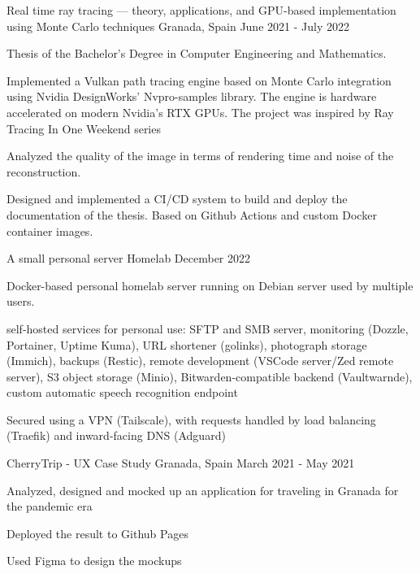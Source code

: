 
\begin{cventries}
    \cventry
      {}
      {Real time ray tracing — theory, applications, and GPU-based implementation using Monte Carlo techniques}
      {Granada, Spain}
      {June 2021 - July 2022}
      {
        \begin{cvitems} %
          \item {Thesis of the Bachelor's Degree in Computer Engineering and Mathematics.}
          \item {Implemented a Vulkan path tracing engine based on Monte Carlo integration using Nvidia DesignWorks' Nvpro-samples library. The engine is hardware accelerated on modern Nvidia's RTX GPUs. The project was inspired by Ray Tracing In One Weekend series}
          \item {Analyzed the quality of the image in terms of rendering time and noise of the reconstruction.}
          \item {Designed and implemented a CI/CD system to build and deploy the documentation of the thesis. Based on Github Actions and custom Docker container images.}
        \end{cvitems}
      }

    \cventry
        {A small personal server}
        {Homelab}
        {}
        {December 2022}
        {
          \begin{cvitems} %
            \item {Docker-based personal homelab server running on Debian server used by multiple users.}
            \item {self-hosted services for personal use: SFTP and SMB server, monitoring (Dozzle, Portainer, Uptime Kuma), URL shortener (golinks), photograph storage (Immich), backups (Restic), remote development (VSCode server/Zed remote server), S3 object storage (Minio), Bitwarden-compatible backend (Vaultwarnde), custom automatic speech recognition endpoint }
            \item {Secured using a VPN (Tailscale), with requests handled by load balancing (Traefik) and inward-facing DNS (Adguard) }
          \end{cvitems}
        }

    \cventry
      {}
      {CherryTrip - UX Case Study}
      {Granada, Spain}
      {March 2021 - May 2021}
      {
        \begin{cvitems} %
          \item {Analyzed, designed and mocked up an application for traveling in Granada for the pandemic era }
          \item {Deployed the result to Github Pages}
          \item {Used Figma to design the mockups}
        \end{cvitems}
      }


\end{cventries}
